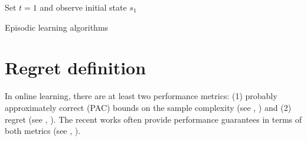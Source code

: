 \begin{algorithm}[ht]
    \DontPrintSemicolon
    \BlankLine
    Set $t=1$ and observe initial state $s_1$ \;
    \caption{Episodic learning algorithms}
    \label{ch:rl:algo:generics}
\end{algorithm}



%

\section{Regret definition}

In online learning, there are at least two performance metrics: (1) probably approximately correct (PAC) bounds on the sample complexity (see \eg, \cite{brafman2002r, kearns2002near, kakade2003sample, dann2015sample, jiang2018open, wang2020long}) and (2) regret (see \eg, \cite{jaksch2010near, osband2013more, azar2017minimax, jin2018q, zanette2019tighter, zhang2019regret}).
The recent works often provide performance guarantees in terms of both metrics (see \eg, \cite{he2021nearly, zhang2021reinforcement}).

